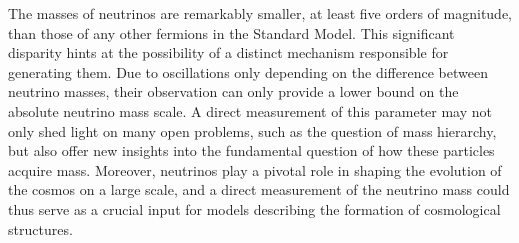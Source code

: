 The masses of neutrinos are remarkably smaller, at least five orders of magnitude, than those of any other fermions in
the Standard Model. This significant disparity hints at the possibility of a distinct mechanism responsible for
generating them. Due to oscillations only depending on the difference between neutrino masses, their observation can only provide a lower
bound on the absolute neutrino mass scale. A direct measurement of this parameter may not only shed light on many open problems,
such as the question of mass hierarchy, but also offer new insights into the fundamental question of how these particles acquire
mass. Moreover, neutrinos play a pivotal role in shaping the evolution of the cosmos on
a large scale, and a direct measurement of the neutrino mass could thus serve as a crucial input for models describing the formation of cosmological structures.

